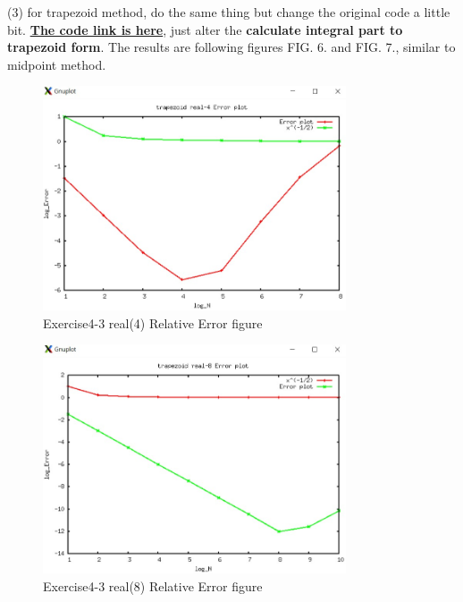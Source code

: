 \documentclass[aps,12pt,prd,nofootinbib,bibnotes, amsmath,amssymb,showpacs,superscriptaddress,floatfix]{revtex4-2}
\begin{document}
(3)
for trapezoid method, do the same thing but change the original code a little bit. \href{https://github.com/kuo1235/Computational-Astrophysics-2022/blob/main/astr660/Homework/HW2/trape.f90}{\bf{The code link is here}}, just alter the {\bf{calculate integral part to trapezoid form}}. The results are following figures FIG. 6. and FIG. 7., similar to midpoint method.\\
\begin{figure}
	\centering
	\includegraphics[width=0.8\textwidth]{Exercise4-3_real4}
	\caption{Exercise4-3 real(4) Relative Error figure}
\end{figure}
\begin{figure}
	\centering
	\includegraphics[width=0.8\textwidth]{Exercise4-3_real8}
	\caption{Exercise4-3 real(8) Relative Error figure}
\end{figure}
\end{document}
